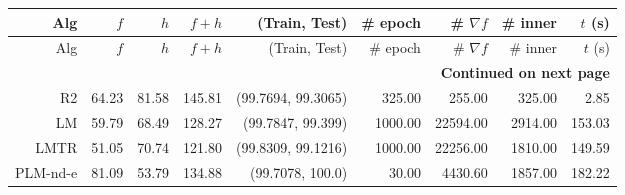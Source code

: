 \begin{longtable}{rrrrrrrrr}
  \hline
  Alg & $ f $ & $ h $ & $ f+h $ & (Train, Test) & \# epoch & \# $ \nabla f $ & \# inner & $t $ (s) \\\hline
  \endfirsthead
  \hline
  Alg & $ f $ & $ h $ & $ f+h $ & (Train, Test) & \# epoch & \# $ \nabla f $ & \# inner & $t $ (s) \\\hline
  \endhead
  \hline
  \multicolumn{9}{r}{{\bfseries Continued on next page}}\\
  \hline
  \endfoot
  \endlastfoot
  R2 &      64.23 &      81.58 &     145.81 & (99.7694, 99.3065) &     325.00 &     255.00 &     325.00 & 2.85 \\
  LM &      59.79 &      68.49 &     128.27 & (99.7847, 99.399) &    1000.00 &   22594.00 &    2914.00 & 153.03 \\
  LMTR &      51.05 &      70.74 &     121.80 & (99.8309, 99.1216) &    1000.00 &   22256.00 &    1810.00 & 149.59 \\
  PLM-nd-e &      81.09 &      53.79 &     134.88 & (99.7078, 100.0) &      30.00 &    4430.60 &    1857.00 & 182.22 \\\hline
\end{longtable}
